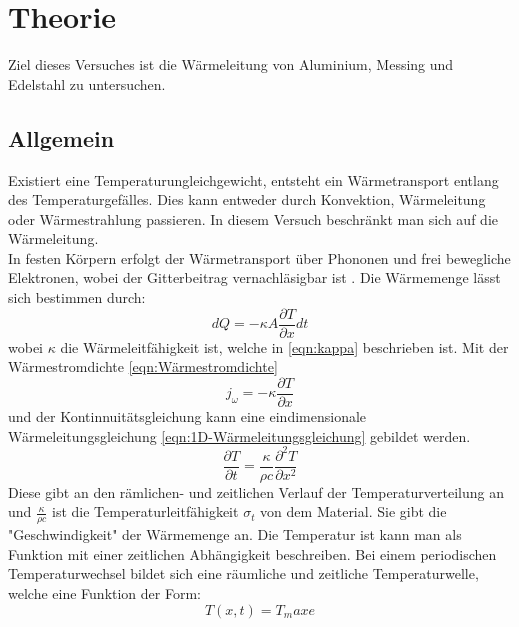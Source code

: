 \section{Theorie}
\label{sec:Theorie}
 
Ziel dieses Versuches ist die Wärmeleitung von Aluminium, Messing und Edelstahl zu untersuchen.

\subsection{Allgemein}

Existiert eine Temperaturungleichgewicht, entsteht ein Wärmetransport entlang des Temperaturgefälles. 
Dies kann entweder durch Konvektion, Wärmeleitung oder Wärmestrahlung passieren.
In diesem Versuch beschränkt man sich auf die Wärmeleitung.\\
In festen Körpern erfolgt der Wärmetransport über Phononen und frei bewegliche Elektronen, wobei der Gitterbeitrag vernachläsigbar ist \cite[1]{V204}.
Die Wärmemenge lässt sich bestimmen durch:
\begin{equation}
    dQ = -\kappa A \frac{\partial T}{\partial x} dt
    \label{eqn:Wärmemenge}
\end{equation}
wobei $\kappa$ die Wärmeleitfähigkeit ist, welche in \autoref{eqn:kappa} beschrieben ist.
Mit der Wärmestromdichte \autoref{eqn:Wärmestromdichte}
\begin{equation}
    j_{\omega} = -\kappa\frac{\partial T}{\partial x}
    \label{eqn:Wärmestromdichte}
\end{equation}
und der Kontinnuitätsgleichung kann eine eindimensionale Wärmeleitungsgleichung \autoref{eqn:1D-Wärmeleitungsgleichung} gebildet werden.
\begin{equation}
    \frac{\partial T}{\partial t} = \frac{\kappa}{\rho c} \frac{\partial ^2 T}{\partial x^2}
    \label{eqn:1D-Wärmeleitungsgleichung}
\end{equation}
Diese gibt an den rämlichen- und zeitlichen Verlauf der Temperaturverteilung an und $\frac{\kappa}{\rho c}$ ist die Temperaturleitfähigkeit $\sigma_t$ von dem Material.
Sie gibt die "Geschwindigkeit" der Wärmemenge an.
Die Temperatur ist kann man als Funktion mit einer zeitlichen Abhängigkeit beschreiben.
Bei einem periodischen Temperaturwechsel bildet sich eine räumliche und zeitliche Temperaturwelle, welche eine Funktion der Form:
\begin{equation}
   T(x,t) = T_max e
\end{equation} 